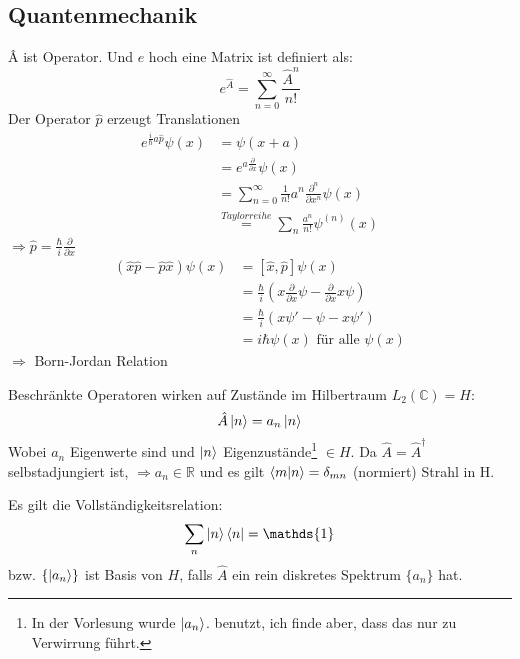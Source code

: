 \subsection{Quantenmechanik}
		\^{A} ist Operator. Und $e$ hoch eine Matrix ist definiert als:
			\begin{equation*}
				e^{\hat{A}}= \sum_{n=0}^{\infty} \frac{\hat{A}^n}{n!}
			\end{equation*}
		Der Operator $\hat{p}$ erzeugt Translationen
			\begin{align*}
				e^{\frac{i}{\hbar} a \hat{p}} \psi(x) &= 
				\psi(x+a) \\
				&= e^{a \frac{\partial}{\partial x}} \psi(x) \\
				&= \sum_{n=0}^{\infty} \frac{1}{n!} a^n \frac{\partial^n}{\partial x^n} \psi(x) \\
				& \overset{Taylorreihe}{=} 
				\sum_{n} \frac{a^n}{n!} \psi^{(n)}(x)				
			\end{align*}
		$\Rightarrow \hat{p} = \frac{\hbar}{i} \frac{\partial}{\partial x}$
			\begin{align*}
				(\hat{x} \hat{p} - \hat{p} \hat{x}) \psi(x)
				&= [\hat{x}, \hat{p}] \psi(x) \\
				&= \frac{\hbar}{i} 
				\left( x \frac{\partial}{\partial x} \psi 
				- \frac{\partial}{\partial x} x \psi
				\right) \\
				&=\frac{\hbar}{i} \left( x \psi' - \psi - x\psi' \right) \\
				&=i \hbar \psi(x) \text{~für alle~} \psi (x)
			\end{align*}
		$ \Rightarrow$  \hspace{0.6cm} Born-Jordan Relation
		
		Beschränkte Operatoren wirken auf Zustände im Hilbertraum $L_2(\mathds{C}) = H$:
			\begin{equation*}
				\hat{A} \ket{n} = a_n \ket{n} 
			\end{equation*}
		Wobei $a_n$ Eigenwerte sind und $\ket{n}$ Eigenzustände\footnote{In der Vorlesung wurde $\ket{a_n}$. benutzt, ich finde aber, dass das nur zu Verwirrung führt.} $\in H$.
		Da $\hat{A} = \hat{A}^\dagger$ selbstadjungiert ist, $\Rightarrow a_n \in \mathds{R}$ und es gilt $\braket{m | n} = \delta_{mn}$ (normiert) \grqq Strahl in H\grqq.
		
		Es gilt die Vollständigkeitsrelation:
			\begin{equation*}
				\sum_n \ket{n} \bra{n} = \mathds{1}
			\end{equation*}
		bzw. $\{ \ket{a_n} \}$ ist Basis von $H$, falls $\hat{A}$ ein rein diskretes Spektrum $\{a_n\}$ hat. 
		
